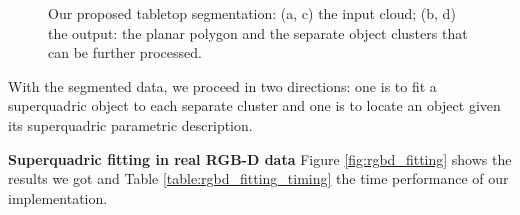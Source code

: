 \documentclass{article}
\begin{document}
\begin{figure}
\centering

\caption{Our proposed tabletop segmentation: (a, c) the input cloud; (b, d) the output: the planar polygon and the separate object clusters that can be further processed.}
\label{fig:tabletop_segmentation}
\end{figure}

With the segmented data, we proceed in two directions: one is to fit a superquadric object to each separate cluster and one is to locate an object given its superquadric parametric description.

\textbf{Superquadric fitting in real RGB-D data}
Figure \ref{fig:rgbd_fitting} shows the results we got and Table \ref{table:rgbd_fitting_timing} the time performance of our implementation.
\end{document}
